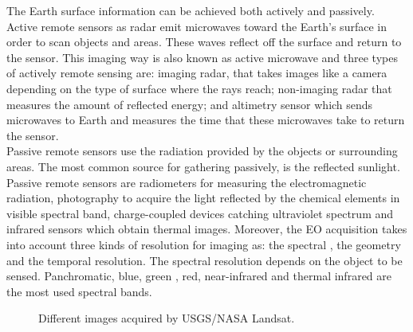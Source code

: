 The Earth surface information can be achieved both actively  and
passively. Active remote sensors as radar emit microwaves toward the Earth's
surface in order to scan objects and areas. These waves reflect off the surface and return to the sensor. This imaging
way is also known as active microwave and three types of actively remote sensing
are: imaging radar, that takes images like a camera depending on the type of
surface where the rays reach; non-imaging radar that measures the amount of reflected energy; and altimetry
sensor which sends microwaves to Earth and measures the time that these
microwaves take to return the sensor.\\
Passive remote sensors use the radiation provided by the objects or surrounding areas. The most common source for gathering passively, is the reflected
sunlight. \\
Passive remote sensors are radiometers for measuring the
electromagnetic radiation, photography to acquire the light reflected by the
chemical elements in visible spectral band, charge-coupled devices catching
ultraviolet spectrum and infrared sensors which obtain thermal images.
Moreover, the \ac{EO} acquisition takes into account three kinds of resolution
for imaging as: the spectral , the geometry and the temporal resolution. The
spectral resolution depends on the object to be sensed. Panchromatic, blue, green , red,
near-infrared and thermal infrared are the
most used spectral bands.

\begin{figure*}
\begin{center}
 \hspace{0.05\textwidth}
\caption{Different images acquired by \acs{USGS}/\acs{NASA} Landsat.}
\end{center}
\end{figure*}


